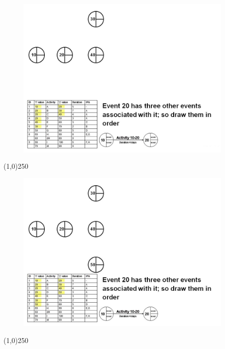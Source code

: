 \begin{frame}
\begin{figure}
	\centering
		\includegraphics[width = 10.5cm]{oldnotes/Slide84.jpg}
\end{figure}
\end{frame}
\begin{center}\line(1,0){250}\end{center}


\begin{frame}
\begin{figure}
	\centering
		\includegraphics[width = 10.5cm]{oldnotes/Slide85.jpg}
\end{figure}
\end{frame}
\begin{center}\line(1,0){250}\end{center}


